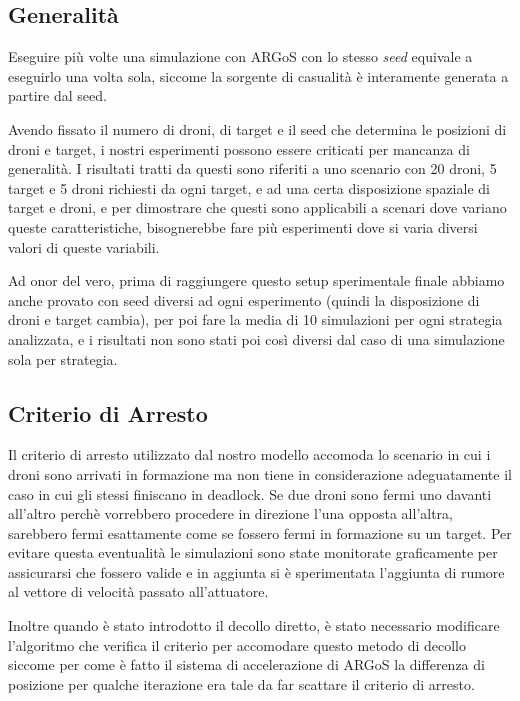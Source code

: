 \documentclass[a4paper,11pt,oneside, table]{article}
\begin{document}
\subsection{Generalit\`a}
Eseguire pi\`u volte una simulazione con ARGoS con lo stesso \textit{seed} equivale a eseguirlo una volta sola, siccome la sorgente di casualit\`a \`e interamente generata a partire dal seed.

Avendo fissato il numero di droni, di target e il seed che determina le posizioni di droni e target, i nostri esperimenti possono essere criticati per mancanza di generalità. I risultati tratti da questi sono riferiti a uno scenario con 20 droni, 5 target e 5 droni richiesti da ogni target, e ad una certa disposizione spaziale di target e droni, e per dimostrare che questi sono applicabili a scenari dove variano queste caratteristiche, bisognerebbe fare pi\`u esperimenti dove si varia diversi valori di queste variabili.

Ad onor del vero, prima di raggiungere questo setup sperimentale finale abbiamo anche provato con seed diversi ad ogni esperimento (quindi la disposizione di droni e target cambia), per poi fare la media di 10 simulazioni per ogni strategia analizzata, e i risultati non sono stati poi così diversi dal caso di una simulazione sola per strategia.

\subsection{Criterio di Arresto}

Il criterio di arresto utilizzato dal nostro modello accomoda lo scenario in cui i droni sono arrivati in formazione ma non tiene in considerazione adeguatamente il caso in cui gli stessi finiscano in deadlock.
Se due droni sono fermi uno davanti all'altro perch\`e vorrebbero procedere in direzione l'una opposta all'altra, sarebbero fermi esattamente come se fossero fermi in formazione su un target.
Per evitare questa eventualit\`a le simulazioni sono state monitorate graficamente per assicurarsi che fossero valide e in aggiunta si \`e sperimentata l'aggiunta di rumore al vettore di velocit\`a passato all'attuatore.

Inoltre quando \`e stato introdotto il decollo diretto, \`e stato necessario modificare l'algoritmo che verifica il criterio per accomodare questo metodo di decollo siccome per come \`e fatto il sistema di accelerazione di ARGoS la differenza di posizione per qualche iterazione era tale da far scattare il criterio di arresto.
\end{document}
